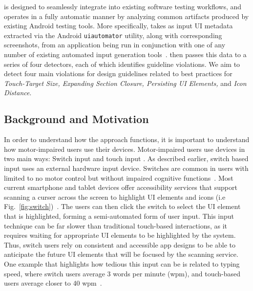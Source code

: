 \MotorEase is designed to seamlessly integrate into existing software testing workflows, and operates in a fully automatic manner by analyzing common artifacts produced by existing Android testing tools. More specifically, \MotorEase takes as input UI metadata extracted via the Android \texttt{\small uiautomator} utility, along with corresponding screenshots, from an application being run in conjunction with one of any number of existing automated input generation tools~\cite{mao2016sapienz,choudhary2015automated,li2017droidbot,ORBITYang,machiry2013dynodroid,Gu:ICSE'19,Moran:ICST'16,crashscope,Su:FSE'17}.
\MotorEase then passes this data to a series of four detectors, each of which identifies guideline violations. We aim to detect four main violations for design guidelines related to best practices for \textit{Touch-Target Size, Expanding Section Closure, Persisting UI Elements,} and \textit{Icon Distance}.

\subsection{Background and Motivation}



\label{sec:motivation}

In order to understand how the \MotorEase approach functions, it is important to understand how motor-impaired users use their devices. Motor-impaired users use devices in two main ways: Switch input and touch input \cite{Zhang13}. As described earlier, switch based input uses an external hardware input device. Switches are common in users with limited to no motor control but without impaired cognitive functions~\cite{Zhang13}. Most current smartphone and tablet devices offer accessibility services that support scanning a curser across the screen to highlight UI elements and icons (i.e Fig.~\ref{fig:switch})~\cite{AppleAccess,GoogleAccess}. The users can then click the switch to select the UI element that is highlighted, forming a semi-automated form of user input. 
This input technique can be far slower than traditional touch-based interactions, as it requires waiting for appropriate UI elements to be highlighted by the system. Thus, switch users rely on consistent and accessible app designs to be able to anticipate the future UI elements that will be focused by the scanning service. One example that highlights how tedious this input can be is related to typing speed, where switch users average 3 words per minute (wpm), and touch-based users average closer to 40 wpm~\cite{MacKenzie11}. 


